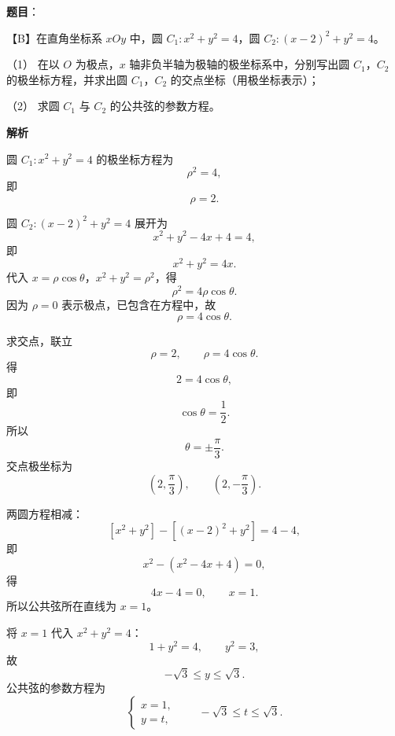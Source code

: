 \begin{answer}

\textbf{题目}：

【B】在直角坐标系 $xOy$ 中，圆 $C_1:x^2+y^2=4$，圆 $C_2:(x-2)^2+y^2=4$。

（1） 在以 $O$ 为极点，$x$ 轴非负半轴为极轴的极坐标系中，分别写出圆 $C_1$，$C_2$ 的极坐标方程，并求出圆 $C_1$，$C_2$ 的交点坐标（用极坐标表示）；

（2） 求圆 $C_1$ 与 $C_2$ 的公共弦的参数方程。

\textbf{解析}


圆 $C_1:x^2+y^2=4$ 的极坐标方程为
\nopagebreak[4]
\[\rho^2=4,\]
即
\nopagebreak[4]
\[\rho=2.\]

圆 $C_2:(x-2)^2+y^2=4$ 展开为
\nopagebreak[4]
\[x^2+y^2-4x+4=4,\]
即
\nopagebreak[4]
\[x^2+y^2=4x.\]
代入 $x=\rho\cos\theta$，$x^2+y^2=\rho^2$，得
\nopagebreak[4]
\[\rho^2=4\rho\cos\theta.\]
因为 $\rho=0$ 表示极点，已包含在方程中，故
\nopagebreak[4]
\[\rho=4\cos\theta.\]

求交点，联立
\nopagebreak[4]
\[\rho=2,\qquad \rho=4\cos\theta.\]
得
\nopagebreak[4]
\[2=4\cos\theta,\]
即
\nopagebreak[4]
\[\cos\theta=\frac12.\]
所以
\nopagebreak[4]
\[\theta=\pm\frac\pi3.\]
交点极坐标为
\nopagebreak[4]
\[\left(2,\frac\pi3\right),\qquad \left(2,-\frac\pi3\right).\]


两圆方程相减：
\nopagebreak[4]
\[[x^2+y^2]-[(x-2)^2+y^2]=4-4,\]
即
\nopagebreak[4]
\[x^2-(x^2-4x+4)=0,\]
得
\nopagebreak[4]
\[4x-4=0,\qquad x=1.\]
所以公共弦所在直线为 $x=1$。

将 $x=1$ 代入 $x^2+y^2=4$：
\nopagebreak[4]
\[1+y^2=4,\qquad y^2=3,\]
故
\nopagebreak[4]
\[-\sqrt3\leqslant y\leqslant\sqrt3.\]
公共弦的参数方程为
\nopagebreak[4]
\[\begin{cases}
x=1,\\
y=t,
\end{cases}\qquad -\sqrt3\leqslant t\leqslant\sqrt3.\]



\end{answer}
